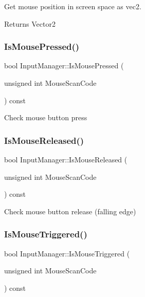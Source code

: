 Get mouse position in screen space as vec2. 

\begin{DoxyReturn}{Returns}
Vector2 
\end{DoxyReturn}
\mbox{\label{classInputManager_a7f316cdb11213c7973a0b601a0193d8a}} 
\subsubsection{\texorpdfstring{Is\+Mouse\+Pressed()}{IsMousePressed()}}
{\footnotesize\ttfamily bool Input\+Manager\+::\+Is\+Mouse\+Pressed (\begin{DoxyParamCaption}\item[{unsigned int}]{Mouse\+Scan\+Code }\end{DoxyParamCaption}) const}

Check mouse button press \mbox{\label{classInputManager_af72d6f8ceb3219220b36a6cc447a42db}} 
\subsubsection{\texorpdfstring{Is\+Mouse\+Released()}{IsMouseReleased()}}
{\footnotesize\ttfamily bool Input\+Manager\+::\+Is\+Mouse\+Released (\begin{DoxyParamCaption}\item[{unsigned int}]{Mouse\+Scan\+Code }\end{DoxyParamCaption}) const}

Check mouse button release (falling edge) \mbox{\label{classInputManager_a036f8dd3a4416c43b0c2942a3c5bb093}} 
\subsubsection{\texorpdfstring{Is\+Mouse\+Triggered()}{IsMouseTriggered()}}
{\footnotesize\ttfamily bool Input\+Manager\+::\+Is\+Mouse\+Triggered (\begin{DoxyParamCaption}\item[{unsigned int}]{Mouse\+Scan\+Code }\end{DoxyParamCaption}) const}

